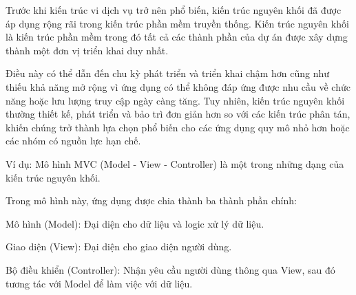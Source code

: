 Trước khi kiến trúc vi dịch vụ trở nên phổ biến, kiến trúc nguyên khối đã được áp dụng rộng rãi trong kiến trúc phần mềm truyền thống. Kiến trúc nguyên khối là kiến trúc phần mềm trong đó tất cả các thành phần của dự án được xây dựng thành một đơn vị triển khai duy nhất.


Điều này có thể dẫn đến chu kỳ phát triển và triển khai chậm hơn cũng như thiếu khả năng mở rộng vì ứng dụng có thể không đáp ứng được nhu cầu về chức năng hoặc lưu lượng truy cập ngày càng tăng. Tuy nhiên, kiến trúc nguyên khối thường thiết kế, phát triển và bảo trì đơn giản hơn so với các kiến trúc phân tán, khiến chúng trở thành lựa chọn phổ biến cho các ứng dụng quy mô nhỏ hơn hoặc các nhóm có nguồn lực hạn chế.

%

Ví dụ: Mô hình MVC (Model - View - Controller) là một trong những dạng của kiến trúc nguyên khối.

Trong mô hình này, ứng dụng được chia thành ba thành phần chính:

Mô hình (Model): Đại diện cho dữ liệu và logic xử lý dữ liệu.

Giao diện (View): Đại diện cho giao diện người dùng.

Bộ điều khiển (Controller): Nhận yêu cầu người dùng thông qua View, sau đó tương tác với Model để làm việc với dữ liệu.

%

